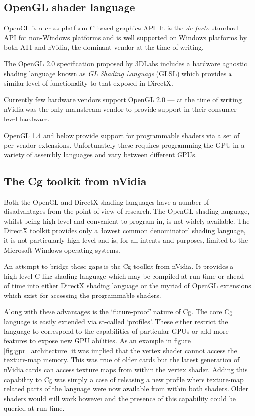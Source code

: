 \subsection{OpenGL shader language}

OpenGL\cite{GPU:OpenGLSpec} is a cross-platform C-based graphics API. 
It is the \emph{de facto} standard API for non-Windows platforms and
is well supported on Windows platforms by both ATI and nVidia, the dominant
vendor at the time of writing. 

The OpenGL 2.0 specification\cite{GPU:OpenGL2Overview} proposed by 3DLabs
includes a hardware agnostic shading language\cite{GPU:OpenGLShadingLanguage}
known as \emph{GL Shading Language} (GLSL) which provides a similar level
of functionality to that exposed in DirectX. 

Currently few hardware vendors support OpenGL 2.0 --- at the time of writing
nVidia was the only mainstream vendor to provide support in their
consumer-level hardware\cite{nvidia:7664relnotes}.

OpenGL 1.4 and below provide support for programmable shaders via a set of per-vendor
extensions. Unfortunately these requires programming the GPU in a variety of
assembly languages and vary between different GPUs.

\subsection{The Cg toolkit from nVidia}

Both the OpenGL and DirectX shading languages have a number of disadvantages
from the point of view of research. The OpenGL shading language, whilst being
high-level and convenient to program in, is not widely available. The
DirectX toolkit provides only a `lowest common denominator' shading language,
it is not particularly high-level and is, for all intents and purposes, limited
to the Microsoft Windows operating systems. 

An attempt to bridge these gaps is the Cg toolkit\cite{nvidia:cgtoolkit} from nVidia.
It provides a high-level C-like shading language which may be compiled at run-time or
ahead of time into either DirectX shading language or the myriad of OpenGL extensions
which exist for accessing the programmable shaders. 

Along with these advantages is the `future-proof' nature of Cg. The core Cg language
is easily extended via so-called `profiles'. These either restrict the language to
correspond to the capabilities of particular GPUs or add more features to expose
new GPU abilities. As an example in figure \ref{fig:gpu_architecture} it was implied
that the vertex shader cannot access the texture-map memory. This was true
of older cards but the latest generation of nVidia cards can
access texture maps from within the vertex shader\cite{nvidia:sm3unleashed}. Adding this
capability to Cg was simply a case of releasing a new profile where texture-map related
parts of the language were now available from within both shaders. Older shaders
would still work however and the presence of this capability could be queried
at run-time.


